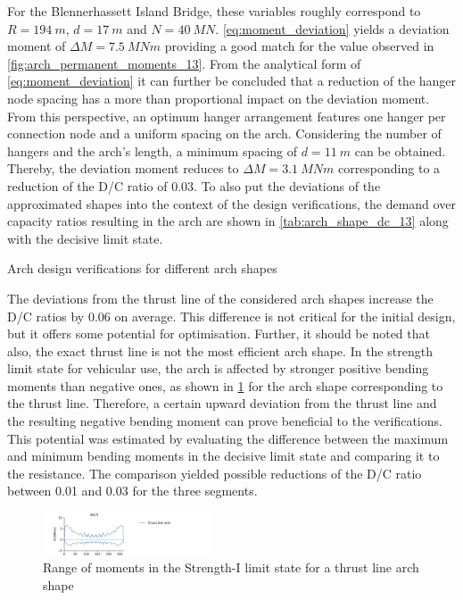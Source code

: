 For the Blennerhassett Island Bridge, these variables roughly correspond to $R=\SI{194}{m}$, $d=\SI{17}{m}$ and $N=\SI{40}{MN}$. \cref{eq:moment_deviation} yields a deviation moment of $\Delta M=\SI{7.5}{MNm}$ providing a good match for the value observed in \cref{fig:arch_permanent_moments_13}. From the analytical form of \cref{eq:moment_deviation} it can further be concluded that a reduction of the hanger node spacing has a more than proportional impact on the deviation moment. From this perspective, an optimum hanger arrangement features one hanger per connection node and a uniform spacing on the arch. Considering the number of hangers and the arch's length, a minimum spacing of $d=\SI{11}{m}$ can be obtained. Thereby, the deviation moment reduces to $\Delta M=\SI{3.1}{MNm}$ corresponding to a reduction of the D/C ratio of 0.03.
To also put the deviations of the approximated shapes into the context of the design verifications, the demand over capacity ratios resulting in the arch are shown in \cref{tab:arch_shape_dc_13} along with the decisive limit state.

\begin{table}[H]
    \centering
    \caption{Arch design verifications for different arch shapes}
    \label{tab:arch_shape_dc_13}
    
\end{table}

The deviations from the thrust line of the considered arch shapes increase the D/C ratios by 0.06 on average. This difference is not critical for the initial design, but it offers some potential for optimisation. Further, it should be noted that also, the exact thrust line is not the most efficient arch shape. In the strength limit state for vehicular use, the arch is affected by stronger positive bending moments than negative ones, as shown in \cref{fig:arch_shape_strength_1} for the arch shape corresponding to the thrust line. Therefore, a certain upward deviation from the thrust line and the resulting negative bending moment can prove beneficial to the verifications. This potential was estimated by evaluating the difference between the maximum and minimum bending moments in the decisive limit state and comparing it to the resistance. The comparison yielded possible reductions of the D/C ratio between 0.01 and 0.03 for the three segments.

\begin{figure}[H]
    \centering
    \includegraphics[trim={1cm 0 10cm 0.48cm},clip, width=0.45\textwidth]{calculations/arch shape/strength-I_13.png}
    \caption{Range of moments in the Strength-I limit state for a thrust line arch shape}
    \label{fig:arch_shape_strength_1}
\end{figure}

